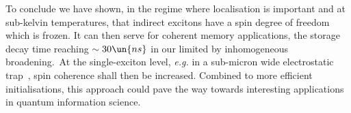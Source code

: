 \documentclass[doublecol,final]{epl2}
\begin{document}
To conclude we have shown, in the regime where localisation is important and at sub-kelvin temperatures, that indirect excitons have a spin degree of freedom which is frozen. It can then serve for coherent memory applications, the storage decay time reaching $\sim 30\un{ns}$ in our  limited by inhomogeneous broadening.~At the single-exciton level, \textit{e.g.} in a sub-micron wide electrostatic trap~\cite{epl17031bib10}, spin coherence shall then be increased. Combined to more efficient initialisations, this approach could pave the way towards interesting applications in quantum information science.

\end{document}
